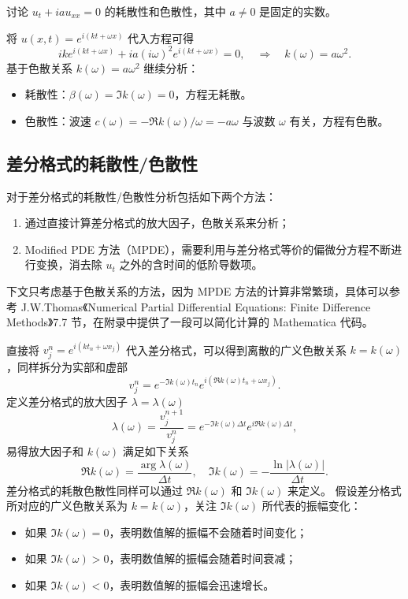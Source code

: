 \begin{example}
    讨论 $u_t + i a u_{xx} = 0$ 的耗散性和色散性，其中 $a \neq 0$ 是固定的实数。
\end{example}

\begin{solution*}
    将 $u(x,t) = e^{i(k t+\omega x)}$ 代入方程可得
    \[
        i k e^{i(k t+\omega x)} + i a (i \omega)^2 e^{i(k t+\omega x)} = 0,
        \quad \Rightarrow \quad
        k(\omega) = a \omega^2.
    \]
    基于色散关系 $ k(\omega) = a \omega^2$ 继续分析：
    \begin{itemize}
        \item 耗散性：$\beta(\omega) = \Im k(\omega) = 0$，方程无耗散。
        \item 色散性：波速 $c(\omega) = - \Re k(\omega) / \omega = - a \omega$ 与波数 $\omega$ 有关，方程有色散。
    \end{itemize}
\end{solution*}


\subsection{差分格式的耗散性/色散性}

对于差分格式的耗散性/色散性分析包括如下两个方法：
\begin{enumerate}
    \item 通过直接计算差分格式的放大因子，色散关系来分析；
    \item Modified PDE 方法（MPDE），需要利用与差分格式等价的偏微分方程不断进行变换，消去除 $u_t$ 之外的含时间的低阶导数项。
\end{enumerate}

\begin{remark}
    下文只考虑基于色散关系的方法，因为 MPDE 方法的计算非常繁琐，具体可以参考 J.W.Thomas《Numerical Partial Differential Equations: Finite Difference Methods》7.7 节，在附录中提供了一段可以简化计算的 Mathematica 代码。
\end{remark}

直接将 $v_j^n = e^{i(k t_n+\omega x_j)}$ 代入差分格式，可以得到离散的广义色散关系 $k=k(\omega)$，同样拆分为实部和虚部
\[
    v_j^n = e^{-\Im k(\omega) t_n} e^{i(\Re k(\omega) t_n + \omega x_j)}.
\]
定义差分格式的放大因子 $\lambda = \lambda(\omega)$
\[
    \lambda(\omega) = \frac{v_j^{n+1}}{v_j^n} = e^{-\Im k(\omega) \Delta t} e^{ i \Re k(\omega) \Delta t},
\]
易得放大因子和 $k(\omega)$ 满足如下关系
\[
    \Re k(\omega) = \frac{\arg \lambda(\omega)}{\Delta t},\quad \Im k(\omega) = - \frac{\ln |\lambda(\omega)|}{\Delta t}.
\]
差分格式的耗散色散性同样可以通过 $\Re k(\omega)$ 和 $\Im k(\omega)$ 来定义。
假设差分格式所对应的广义色散关系为 $k=k(\omega)$，关注 $\Im k(\omega)$ 所代表的振幅变化：
\begin{itemize}
    \item 如果 $\Im k(\omega) = 0$，表明数值解的振幅不会随着时间变化；
    \item 如果 $\Im k(\omega) > 0$，表明数值解的振幅会随着时间衰减；
    \item 如果 $\Im k(\omega) < 0$，表明数值解的振幅会迅速增长。
\end{itemize}

